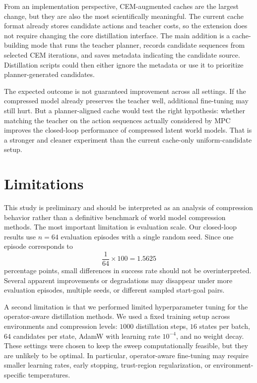 \documentclass[11pt]{article}
\begin{document}
From an implementation perspective, CEM-augmented caches are the largest change, but they are also the most scientifically meaningful. The current cache format already stores candidate actions and teacher costs, so the extension does not require changing the core distillation interface. The main addition is a cache-building mode that runs the teacher planner, records candidate sequences from selected CEM iterations, and saves metadata indicating the candidate source. Distillation scripts could then either ignore the metadata or use it to prioritize planner-generated candidates.

The expected outcome is not guaranteed improvement across all settings. If the compressed model already preserves the teacher well, additional fine-tuning may still hurt. But a planner-aligned cache would test the right hypothesis: whether matching the teacher on the action sequences actually considered by MPC improves the closed-loop performance of compressed latent world models. That is a stronger and cleaner experiment than the current cache-only uniform-candidate setup.

\section{Limitations}
\label{sec:limitations}

This study is preliminary and should be interpreted as an analysis of compression behavior rather than a definitive benchmark of world model compression methods. The most important limitation is evaluation scale. Our closed-loop results use \(n=64\) evaluation episodes with a single random seed. Since one episode corresponds to
\[
    \frac{1}{64} \times 100 = 1.5625
\]
percentage points, small differences in success rate should not be overinterpreted. Several apparent improvements or degradations may disappear under more evaluation episodes, multiple seeds, or different sampled start-goal pairs.

A second limitation is that we performed limited hyperparameter tuning for the operator-aware distillation methods. We used a fixed training setup across environments and compression levels: \(1000\) distillation steps, \(16\) states per batch, \(64\) candidates per state, AdamW with learning rate \(10^{-4}\), and no weight decay. These settings were chosen to keep the sweep computationally feasible, but they are unlikely to be optimal. In particular, operator-aware fine-tuning may require smaller learning rates, early stopping, trust-region regularization, or environment-specific temperatures.
\end{document}
